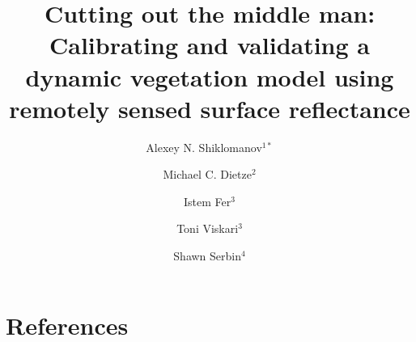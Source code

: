 \documentclass{article}
\title{Cutting out the middle man: Calibrating and validating a dynamic vegetation model using remotely sensed surface reflectance}
\author{%
  Alexey N. Shiklomanov$^{1*}$ \and
  Michael C. Dietze$^{2}$ \and
  Istem Fer$^{3}$ \and
  Toni Viskari$^{3}$ \and
  Shawn Serbin$^{4}$
}
\date{%
  \begin{flushleft}
    \begin{small}
      $^{1}$ NASA Goddard Space Flight Center, Greenbelt, MD, USA\\%
      $^{2}$ Department of Earth and Environment, Boston University, Boston, MA, USA\\%
      $^{3}$ Finnish Meteorological Institute, Helsinki, Finland\\%
      $^{4}$ Brookhaven National Laboratory, Brookhaven, NY, USA\\%
      \medskip
      $^{*}$ \emph{Corresponding author}\\%
      NASA Goddard Space Flight Center\\%
      8800 Greenbelt Rd., Building 33\\%
      Greenbelt, MD 20771\\%
      Email: alexey.shiklomanov@nasa.gov Phone: 240--784--9862
    \end{small}
  \end{flushleft}
}
\begin{document}
\maketitle






\section{References}

\printbibliography


\end{document}
